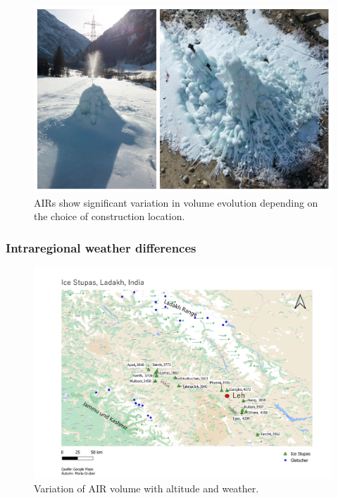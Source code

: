 \begin{figure}[t]
\centering
\includegraphics[width=12cm]{Figures/2AIRs.jpg}
\caption{AIRs show significant variation in volume evolution depending on the choice of construction location.}
\label{fig:2AIRs}
\end{figure}

\subsubsection{Intraregional weather differences}

\begin{figure}[t]
\centering
\includegraphics[width=12cm]{Figures/ISC_villages_Maria.png}
\caption{Variation of AIR volume with altitude and weather.}
\label{fig:altitudevsvolume}
\end{figure}

